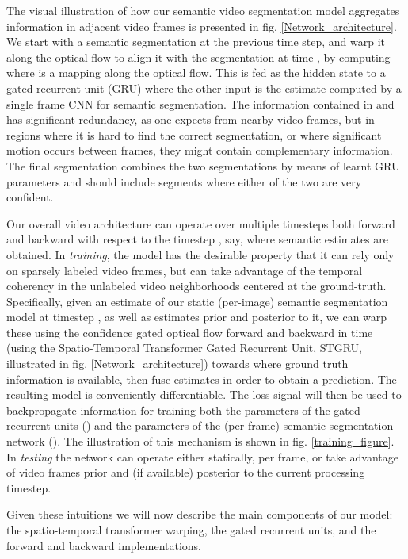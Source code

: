 \documentclass[10pt,twocolumn,letterpaper]{article}
\begin{document}
The visual illustration of how our semantic video segmentation model aggregates information in adjacent video frames is presented in fig. \ref{Network_architecture}. We start with a semantic segmentation at the previous time step,  and warp it along the optical flow to align it with the segmentation at time , by computing  where  is a mapping along the optical flow. This is fed as the hidden state to a gated recurrent unit (GRU) where the other input is the estimate  computed by a single frame CNN for semantic segmentation. The information contained in  and  has significant redundancy, as one expects from nearby video frames, but in regions where it is hard to find the correct segmentation, or where significant motion occurs between frames, they might contain complementary information. The final segmentation  combines the two segmentations by means of learnt GRU parameters and should include segments where either of the two are very confident. 

Our overall video architecture can operate over multiple timesteps both forward and backward with respect to the timestep , say, where semantic estimates are obtained. In \emph{training}, the model has the desirable property that it can rely only on sparsely labeled video frames, but can take advantage of the temporal coherency in the unlabeled video neighborhoods centered at the ground-truth. Specifically, given an estimate of our static (per-image) semantic segmentation model at timestep , as well as estimates prior and posterior to it, we can warp these using the confidence gated optical flow forward and backward in time (using the Spatio-Temporal Transformer Gated Recurrent Unit, STGRU, illustrated in fig. \ref{Network_architecture}) towards  where ground truth information is available, then fuse estimates in order to obtain a prediction. The resulting model is conveniently differentiable. The loss signal will then be used to backpropagate information for training both the parameters of the gated recurrent units () and the parameters of the (per-frame) semantic segmentation network (). The illustration of this mechanism is shown in fig. \ref{training_figure}. In \emph{testing} the network can operate either statically, per frame, or take advantage of video frames prior and (if available) posterior to the current processing timestep.

Given these intuitions we will now describe the main components of our model: the spatio-temporal transformer warping, the gated recurrent units, and the forward and backward implementations.
\end{document}
